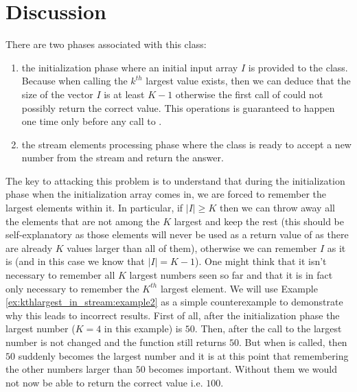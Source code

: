 \section{Discussion}
\label{kth_largest_in_stream:sec:discussion}
There are two phases associated with this class:
\begin{enumerate}
	\item the initialization phase where an initial input array $I$ is provided to the class.
		Because when calling  the $k^{th}$ largest value exists, then we can deduce that
		the size of the vector $I$ is at least $K-1$ otherwise the first call of  could
		not possibly return the correct value. This operations is guaranteed to happen one time only
		before any call to .
	\item the stream elements processing phase where the class is ready to accept a new number from
	the stream and return the answer.
\end{enumerate}
The key to attacking this problem is to understand that during the initialization phase when the initialization
array comes in, we are forced to remember the largest elements within it. In particular, if $|I| \geq K$
then we can throw away all the elements that are not among the $K$ largest and keep the rest (this
should be self-explanatory as those elements will never be used as a return value of  as
there are already $K$ values larger than all of them), otherwise we can remember $I$ as it is (and
in this case we know that $|I| = K-1$). One might think that it isn't necessary to remember all $K$
largest numbers seen so far and that it is in fact only necessary to remember the $K^{th}$ largest
element. We will use Example \ref{ex:kthlargest_in_stream:example2} as a simple counterexample to
demonstrate why this leads to incorrect results. First of all, after the initialization phase the
 largest number ($K=4$ in this example) is $50$. Then, after the call to  the
 largest number is not changed and the function still returns $50$. But when
 is called, then $50$ suddenly becomes the  largest number and it is at this point that remembering the other numbers larger than $50$ becomes important. Without them we would not now be
able to return the correct value i.e. $100$.

